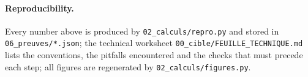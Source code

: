\paragraph{Reproducibility.} Every number above is produced by \texttt{02\_calculs/repro.py} and stored in \texttt{06\_preuves/*.json}; the technical worksheet \texttt{00\_cible/FEUILLE\_TECHNIQUE.md} lists the conventions, the pitfalls encountered and the checks that must precede each step; all figures are regenerated by \texttt{02\_calculs/figures.py}.



\toolsstatement
{}



